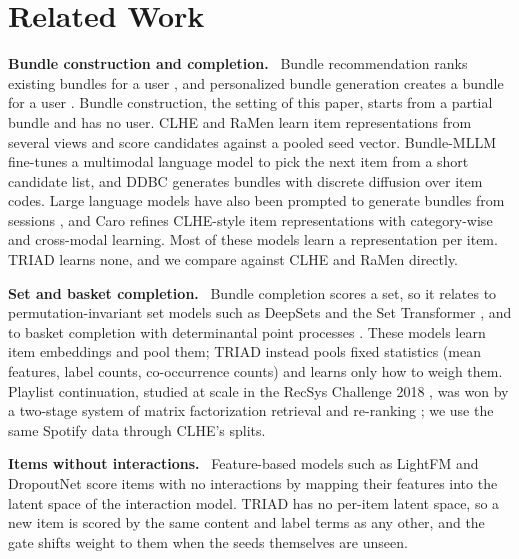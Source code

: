 \documentclass[runningheads]{llncs}
\renewcommand{\paragraph}[1]{\smallskip\noindent\textbf{#1}\ }
\begin{document}
\section{Related Work}

\paragraph{Bundle construction and completion.} Bundle recommendation ranks existing bundles for a user
\cite{bgcn,crosscbr}, and personalized bundle generation creates a bundle for a user \cite{bgn,pog}. Bundle
construction, the setting of this paper, starts from a partial bundle and has no user. CLHE \cite{clhe} and RaMen
\cite{ramen} learn item representations from several views and score candidates against a pooled seed vector.
Bundle-MLLM \cite{bundlemllm} fine-tunes a multimodal language model to pick the next item from a short candidate list,
and DDBC \cite{ddbc} generates bundles with discrete diffusion over item codes. Large language models have also been
prompted to generate bundles from sessions \cite{adabundle}, and Caro \cite{caro} refines CLHE-style item
representations with category-wise and cross-modal learning. Most of these models learn a representation per item. TRIAD learns none, and we compare against CLHE and RaMen directly.

\paragraph{Set and basket completion.} Bundle completion scores a set, so it relates to permutation-invariant set
models such as DeepSets \cite{deepsets} and the Set Transformer \cite{settransformer}, and to basket completion with
determinantal point processes \cite{gartrell2017}. These models learn item embeddings and pool them; TRIAD instead
pools fixed statistics (mean features, label counts, co-occurrence counts) and learns only how to weigh them.
Playlist continuation, studied at scale in the RecSys Challenge 2018 \cite{spotify}, was won by a two-stage system of
matrix factorization retrieval and re-ranking \cite{volkovs2018}; we use the same Spotify data through CLHE's splits.

\paragraph{Items without interactions.} Feature-based models such as LightFM \cite{lightfm} and DropoutNet
\cite{dropoutnet} score items with no interactions by mapping their features into the latent space of the
interaction model. TRIAD has no per-item latent space, so a new item is scored by the same content and label terms as
any other, and the gate shifts weight to them when the seeds themselves are unseen.
\end{document}

